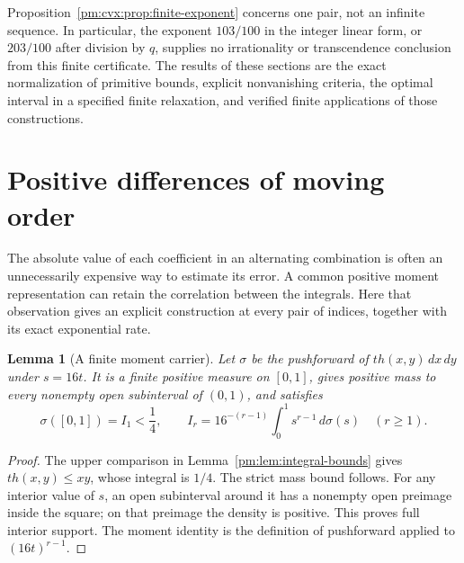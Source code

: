 \documentclass[11pt,a4paper]{article}
\newtheorem{lemma}[theorem]{Lemma}
\theoremstyle{definition}
\theoremstyle{remark}
\numberwithin{equation}{section}
\begin{document}
Proposition~\ref{pm:cvx:prop:finite-exponent} concerns one pair, not an
infinite sequence.  In particular, the exponent $103/100$ in the
integer linear form, or $203/100$ after division by $q$, supplies no
irrationality or transcendence conclusion from this finite
certificate.  The results of these sections are the exact
normalization of primitive bounds, explicit nonvanishing criteria,
the optimal interval in a specified finite relaxation, and verified
finite applications of those constructions.


\section{Positive differences of moving order}\label{pm:sec:damping}

The absolute value of each coefficient in an alternating combination is
often an unnecessarily expensive way to estimate its error.  A common
positive moment representation can retain the correlation between the
integrals.  Here that observation gives an explicit construction at every
pair of indices, together with its exact exponential rate.

\begin{lemma}[A finite moment carrier]\label{pm:dm:measure}
Let $\sigma$ be the pushforward of $t h(x,y)\,dx\,dy$ under $s=16t$.
It is a finite positive measure on $[0,1]$, gives positive mass to every
nonempty open subinterval of $(0,1)$, and satisfies
\begin{equation}\label{pm:dm:moment}
 \sigma([0,1])=I_1<\frac14,\qquad
 I_r=16^{-(r-1)}\int_0^1s^{r-1}\,d\sigma(s)\quad(r\ge1).
\end{equation}
\end{lemma}
\begin{proof}
The upper comparison in Lemma~\ref{pm:lem:integral-bounds} gives
$t h(x,y)\le xy$, whose integral is $1/4$.  The strict mass bound follows.
For any interior value of $s$, an open subinterval around it has a nonempty
open preimage inside the square; on that preimage the density is positive.
This proves full interior support.  The moment identity is the definition
of pushforward applied to $(16t)^{r-1}$.
\end{proof}
\end{document}
